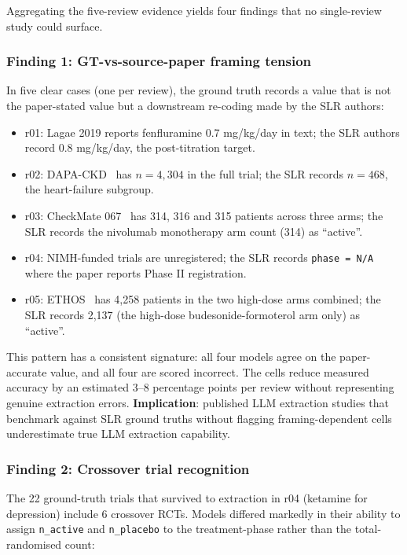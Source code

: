 \documentclass[a4paper,fleqn]{cas-sc}
\begin{document}
Aggregating the five-review evidence yields four findings that no
single-review study could surface.

\subsubsection{Finding 1: GT-vs-source-paper framing tension}

In five clear cases (one per review), the ground truth records a value
that is not the paper-stated value but a downstream re-coding made by
the SLR authors:

\begin{itemize}
\item r01: Lagae 2019 reports fenfluramine 0.7 mg/kg/day in text; the
SLR authors record 0.8 mg/kg/day, the post-titration target.
\item r02: DAPA-CKD~\citep{mcmurray2019dapahf} has $n=4{,}304$ in the
full trial; the SLR records $n=468$, the heart-failure subgroup.
\item r03: CheckMate 067~\citep{larkin2015checkmate067} has 314, 316
and 315 patients across three arms; the SLR records the nivolumab
monotherapy arm count (314) as ``active''.
\item r04: NIMH-funded trials are unregistered; the SLR records
\texttt{phase = N/A} where the paper reports Phase II registration.
\item r05: ETHOS~\citep{rabe2020ethos} has 4,258 patients in the two
high-dose arms combined; the SLR records 2,137 (the high-dose
budesonide-formoterol arm only) as ``active''.
\end{itemize}

This pattern has a consistent signature: all four models agree on the
paper-accurate value, and all four are scored incorrect.
The cells reduce measured accuracy by an estimated 3--8 percentage
points per review without representing genuine extraction errors.
\textbf{Implication}: published LLM extraction studies that benchmark
against SLR ground truths without flagging framing-dependent cells
underestimate true LLM extraction capability.

\subsubsection{Finding 2: Crossover trial recognition}

The 22 ground-truth trials that survived to extraction in r04
(ketamine for depression) include 6 crossover RCTs. Models differed
markedly in their ability to assign \texttt{n\_active} and
\texttt{n\_placebo} to the treatment-phase rather than the
total-randomised count:
\end{document}

